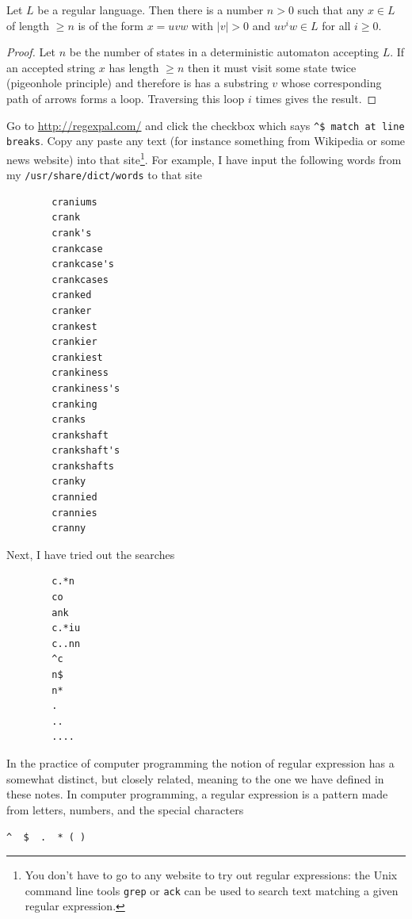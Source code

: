 \begin{thm} Let $L$ be a regular language. Then there
    is a number $n>0$ such that any $x\in L$ of length $ \ge n$ is of the
    form $x=uvw$ with $|v|>0$ and $uv^iw\in L$ for all $i\ge 0$.
\end{thm}
\begin{proof}
    Let $n$ be the number of states in a deterministic automaton
    accepting $L$. If an accepted string $x$ has length $\ge n$ then
    it must visit some state twice (pigeonhole principle) and
    therefore is has a substring $v$ whose corresponding path of
    arrows forms a loop. Traversing this loop $i$ times gives the
    result.
\end{proof}

\begin{ap}
    Go to \url{http://regexpal.com/} and click the checkbox which says
    \verb|^$ match at line breaks|. Copy any paste any text (for
    instance something from Wikipedia or some news website) into that
    site\footnote{You don't have to go to any website to try out
    regular expressions: the Unix command line tools \texttt{grep} or
    \texttt{ack} can be used to search text matching a given regular
    expression.}. For example, I have input the following words from
    my \texttt{/usr/share/dict/words} to that site

\begin{verbatim}
        craniums
        crank
        crank's
        crankcase
        crankcase's
        crankcases
        cranked
        cranker
        crankest
        crankier
        crankiest
        crankiness
        crankiness's
        cranking
        cranks
        crankshaft
        crankshaft's
        crankshafts
        cranky
        crannied
        crannies
        cranny
\end{verbatim}

Next, I have tried out the searches

\begin{verbatim}
        c.*n
        co
        ank
        c.*iu
        c..nn
        ^c
        n$
        n*
        .
        ..
        ....
\end{verbatim}

In the practice of computer programming the notion of regular
expression has a somewhat distinct, but closely related, meaning to
the one we have defined in these notes. In computer programming, a
regular expression is a pattern made from letters, numbers, and the
special characters
\begin{center}
\verb|^  $  .  * ( )|
\end{center}


\end{ap}
